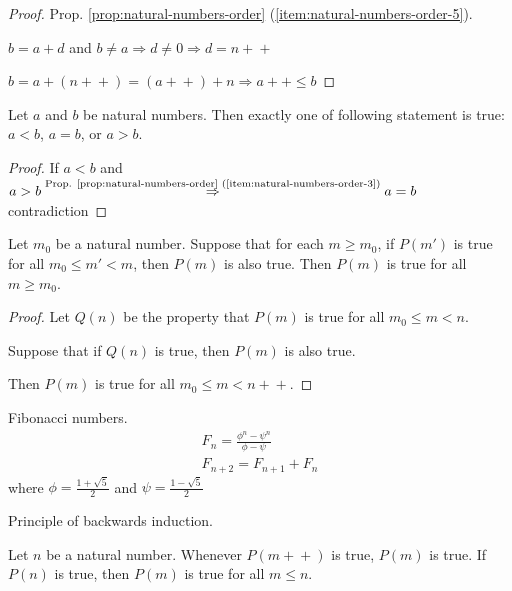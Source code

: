 \documentclass{article}
\newcommand{\pp}{\!+\!+}
\begin{document}
\begin{proof}
    Prop. \ref{prop:natural-numbers-order} (\ref{item:natural-numbers-order-5}).

    $b=a+d$ and $b \neq a \Rightarrow d \neq 0 \Rightarrow d = n\pp$

    $b=a+(n\pp)=(a\pp)+n \Rightarrow a\pp \leq b$
\end{proof}

\begin{proposition}
    Let $a$ and $b$ be natural numbers. Then exactly one of following statement is true:
    $a<b$, $a=b$, or $a>b$.
\end{proposition}

\begin{proof}
    If $a<b$ and $a>b \overset{\text{Prop. \ref{prop:natural-numbers-order} (\ref{item:natural-numbers-order-3})}}{\Rightarrow} a=b$ contradiction
\end{proof}

\begin{proposition}
    Let $m_{0}$ be a natural number. Suppose that for each $m \geq m_{0}$, if $P(m')$ is true for all $m_{0} \leq m' < m$, then $P(m)$ is also true. Then $P(m)$ is true for all $m \geq m_{0}$.
\end{proposition}

\begin{proof}
    Let $Q(n)$ be the property that $P(m)$ is true for all $m_{0} \leq m < n$.

    Suppose that if $Q(n)$ is true, then $P(m)$ is also true.

    Then $P(m)$ is true for all $m_{0} \leq m < n\pp$.
\end{proof}

\begin{example}
    Fibonacci numbers.
    \begin{gather}
        \label{eq:fibonacci-numbers}
        F_{n} = \frac{\phi^{n} - \psi^{n}}{\phi-\psi} \\
        F_{n+2} = F_{n+1} + F_{n}
    \end{gather}
    where $\phi=\frac{1+\sqrt{5}}{2}$ and $\psi=\frac{1-\sqrt{5}}{2}$
\end{example}

\begin{exercise}
    Principle of backwards induction.

    Let $n$ be a natural number. Whenever $P(m\pp)$ is true, $P(m)$ is true.
    If $P(n)$ is true, then $P(m)$ is true for all $m \leq n$.
\end{exercise}
\end{document}

